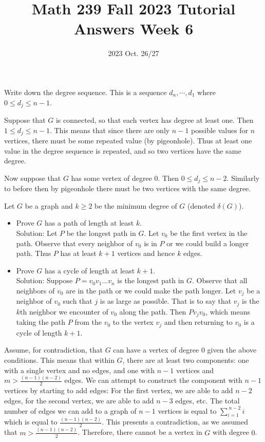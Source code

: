 \title{Math 239 Fall 2023 Tutorial Answers Week 6}

\date{2023 Oct. 26/27}
\maketitle

\begin{enumerate}
     Write down the degree sequence. This is a sequence $d_n , \cdots, d_1$ where $0 \leq d_j \leq n-1$.
    
    Suppose that $G$ is connected, so that each vertex has degree at least one. Then $1 \leq d_j \leq n-1$. This means that since there are only $n-1$ possible values for $n$ vertices, there must be some repeated value (by pigeonhole). Thus at least one value in the degree sequence is repeated, and so two vertices have the same degree.

    Now suppose that $G$ has some vertex of degree $0$. Then $0 \leq d_j \leq n-2$. Similarly to before then by pigeonhole there must be two vertices with the same degree.

    \newpage
     Let $G$ be a graph and $k\geq 2$ be the minimum degree of $G$ (denoted $\delta(G)$).
    \begin{itemize}
        \item Prove $G$ has a path of length at least $k$.\\
        Solution: Let $P$ be the longest path in $G$. Let $v_0$ be the first vertex in the path. Observe that every neighbor of $v_0$ is in $P$ or we could build a longer path. Thus $P$ has at least $k+1$ vertices and hence $k$ edges. 
        \item Prove $G$ has a cycle of length at least $k+1$. \\
        Solution: Suppose $P=v_0v_1...v_n$ is the longest path in $G$. Observe that all neighbors of $v_0$ are in the path or we could make the path longer. Let $v_j$ be a neighbor of $v_0$ such that $j$ is as large as possible. That is to say that $v_j$ is the $k$th neighbor we encounter of $v_0$ along the path. Then $Pv_jv_0$, which means taking the path $P$ from the $v_0$ to the vertex $v_j$ and then returning to $v_0$ is a cycle of length $k+1$.  
    \end{itemize}
    

    \newpage
     Assume, for contradiction, that \(G\) can have a vertex of degree \(0\) given the above conditions. This means that within \(G\), there are at least two components: one with a single vertex and no edges, and one with \(n - 1\) vertices and \(m > \frac{(n-1)(n-2)}{2}\) edges. We can attempt to construct the component with \(n-1\) vertices by starting to add edges: For the first vertex, we are able to add \(n-2\) edges, for the second vertex, we are able to add \(n-3\) edges, etc. The total number of edges we can add to a graph of \(n-1\) vertices is equal to $\sum_{i=1}^{\ n-2} i $ which is equal to \( \frac{(n-1)(n-2)}{2}\). This presents a contradiction, as we assumed that \(m > \frac{(n-1)(n-2)}{2}\). Therefore, there cannot be a vertex in \(G\) with degree \(0\).


\end{enumerate}
